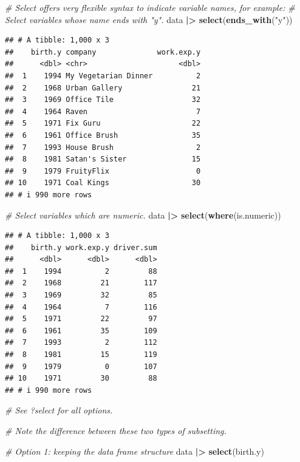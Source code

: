 \documentclass[
]{book}
\newenvironment{Shaded}{\begin{snugshade}}{\end{snugshade}}
\newcommand{\CommentTok}[1]{\textcolor[rgb]{0.56,0.35,0.01}{\textit{#1}}}
\newcommand{\FunctionTok}[1]{\textcolor[rgb]{0.13,0.29,0.53}{\textbf{#1}}}
\newcommand{\NormalTok}[1]{#1}
\newcommand{\SpecialCharTok}[1]{\textcolor[rgb]{0.81,0.36,0.00}{\textbf{#1}}}
\newcommand{\StringTok}[1]{\textcolor[rgb]{0.31,0.60,0.02}{#1}}
\begin{document}
\begin{Shaded}
\begin{Highlighting}[]
\CommentTok{\# Select offers very flexible syntax to indicate variable names, for example:}
\CommentTok{\# Select variables whose name ends with "y".}
\NormalTok{data }\SpecialCharTok{|\textgreater{}} 
  \FunctionTok{select}\NormalTok{(}\FunctionTok{ends\_with}\NormalTok{(}\StringTok{"y"}\NormalTok{))}
\end{Highlighting}
\end{Shaded}

\begin{verbatim}
## # A tibble: 1,000 x 3
##    birth.y company              work.exp.y
##      <dbl> <chr>                     <dbl>
##  1    1994 My Vegetarian Dinner          2
##  2    1968 Urban Gallery                21
##  3    1969 Office Tile                  32
##  4    1964 Raven                         7
##  5    1971 Fix Guru                     22
##  6    1961 Office Brush                 35
##  7    1993 House Brush                   2
##  8    1981 Satan's Sister               15
##  9    1979 FruityFlix                    0
## 10    1971 Coal Kings                   30
## # i 990 more rows
\end{verbatim}

\begin{Shaded}
\begin{Highlighting}[]
\CommentTok{\# Select variables which are numeric.}
\NormalTok{data }\SpecialCharTok{|\textgreater{}} 
  \FunctionTok{select}\NormalTok{(}\FunctionTok{where}\NormalTok{(is.numeric))}
\end{Highlighting}
\end{Shaded}

\begin{verbatim}
## # A tibble: 1,000 x 3
##    birth.y work.exp.y driver.sum
##      <dbl>      <dbl>      <dbl>
##  1    1994          2         88
##  2    1968         21        117
##  3    1969         32         85
##  4    1964          7        116
##  5    1971         22         97
##  6    1961         35        109
##  7    1993          2        112
##  8    1981         15        119
##  9    1979          0        107
## 10    1971         30         88
## # i 990 more rows
\end{verbatim}

\begin{Shaded}
\begin{Highlighting}[]
\CommentTok{\# See ?select for all options.}

\CommentTok{\# Note the difference between these two types of subsetting.}

\CommentTok{\# Option 1: keeping the data frame structure}
\NormalTok{data }\SpecialCharTok{|\textgreater{}} 
  \FunctionTok{select}\NormalTok{(birth.y)}
\end{Highlighting}
\end{Shaded}
\end{document}
